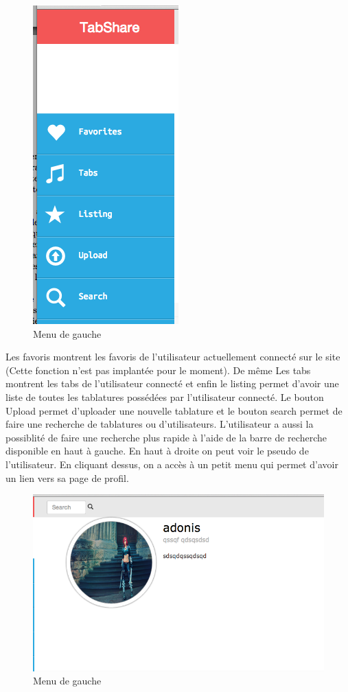 \begin{figure}[H]
\centering
\includegraphics[scale=0.5]{leftWEB}
\caption{Menu de gauche}
\end{figure}

Les favoris montrent les favoris de l'utilisateur actuellement connecté sur le site (Cette fonction n'est pas implantée pour le moment). De même Les tabs montrent les tabs de l'utilisateur connecté et enfin le listing permet d'avoir une liste de toutes les tablatures possédées par l'utilisateur connecté. Le bouton Upload permet d'uploader une nouvelle tablature et le bouton search permet de faire une recherche de tablatures ou d'utilisateurs. L'utilisateur a aussi la possiblité de faire une recherche plus rapide à l'aide de la barre de recherche disponible en haut à gauche. En haut à droite on peut voir le pseudo de l'utilisateur. En cliquant dessus, on a accès à un petit menu qui permet d'avoir un lien vers sa page de profil. \\

\begin{figure}[H]
\centering
\includegraphics[scale=0.5]{centerWEB}
\caption{Menu de gauche}
\end{figure}

